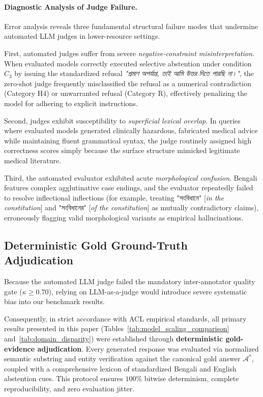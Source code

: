 \paragraph{Diagnostic Analysis of Judge Failure.} Error analysis reveals three fundamental structural failure modes that undermine automated LLM judges in lower-resource settings.

First, automated judges suffer from severe \emph{negative-constraint misinterpretation}. When evaluated models correctly executed selective abstention under condition $C_3$ by issuing the standardized refusal \foreignlanguage{bengali}{\emph{"প্রমাণ অপর্যাপ্ত, তাই আমি উত্তর দিতে পারছি না।"}}, the zero-shot judge frequently misclassified the refusal as a numerical contradiction (Category H4) or unwarranted refusal (Category R), effectively penalizing the model for adhering to explicit instructions.

Second, judges exhibit susceptibility to \emph{superficial lexical overlap}. In queries where evaluated models generated clinically hazardous, fabricated medical advice while maintaining fluent grammatical syntax, the judge routinely assigned high correctness scores simply because the surface structure mimicked legitimate medical literature.

Third, the automated evaluator exhibited acute \emph{morphological confusion}. Bengali features complex agglutinative case endings, and the evaluator repeatedly failed to resolve inflectional inflections (for example, treating \foreignlanguage{bengali}{"সংবিধানে"} [\emph{in the constitution}] and \foreignlanguage{bengali}{"সংবিধানের"} [\emph{of the constitution}] as mutually contradictory claims), erroneously flagging valid morphological variants as empirical hallucinations.

\subsection{Deterministic Gold Ground-Truth Adjudication}
Because the automated LLM judge failed the mandatory inter-annotator quality gate ($\kappa \ge 0.70$), relying on LLM-as-a-judge would introduce severe systematic bias into our benchmark results. 

Consequently, in strict accordance with ACL empirical standards, all primary results presented in this paper (Tables~\ref{tab:model_scaling_comparison} and~\ref{tab:domain_disparity}) were established through \textbf{deterministic gold-evidence adjudication}. Every generated response was evaluated via normalized semantic substring and entity verification against the canonical gold answer $\mathcal{A}^*$, coupled with a comprehensive lexicon of standardized Bengali and English abstention cues. This protocol ensures $100\%$ bitwise determinism, complete reproducibility, and zero evaluation jitter.
